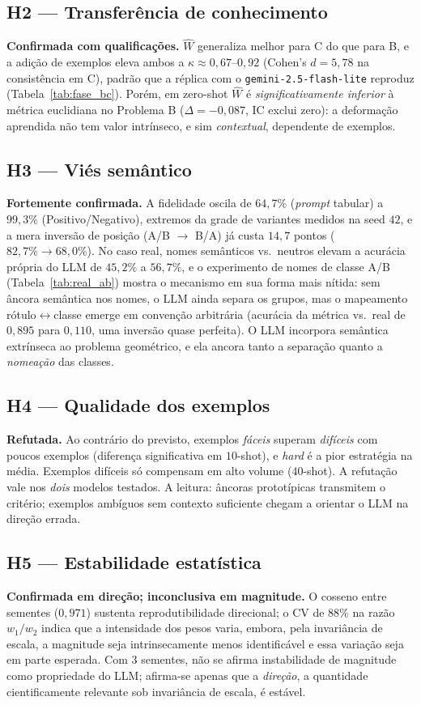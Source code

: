 \documentclass[12pt,a4paper]{article}
\newcommand{\West}{\ensuremath{\hat{W}}}   %
\begin{document}
\subsection{H2 — Transferência de conhecimento}
\textbf{Confirmada com qualificações.} \West{} generaliza melhor para C do que para B, e a
adição de exemplos eleva ambos a $\kappa \approx 0{,}67$–$0{,}92$ (Cohen's $d = 5{,}78$ na
consistência em C), padrão que a réplica com o \texttt{gemini-2.5-flash-lite} reproduz
(Tabela~\ref{tab:fase_bc}). Porém, em zero-shot \West{} é \emph{significativamente inferior} à
métrica euclidiana no Problema B ($\Delta = -0{,}087$, IC exclui zero): a deformação
aprendida não tem valor intrínseco, e sim \emph{contextual}, dependente de exemplos.

\subsection{H3 — Viés semântico}
\textbf{Fortemente confirmada.} A fidelidade oscila de $64{,}7\%$ (\emph{prompt} tabular) a
$99{,}3\%$ (Positivo/Negativo), extremos da grade de variantes medidos na seed $42$, e a
mera inversão de posição (A/B $\to$ B/A) já custa $14{,}7$ pontos ($82{,}7\% \to 68{,}0\%$).
No caso real, nomes semânticos vs.\ neutros elevam a acurácia própria do LLM de $45{,}2\%$ a
$56{,}7\%$, e o experimento de nomes de classe A/B (Tabela~\ref{tab:real_ab}) mostra o
mecanismo em sua forma mais nítida: sem âncora semântica nos nomes, o LLM ainda separa os
grupos, mas o mapeamento rótulo$\leftrightarrow$classe emerge em convenção arbitrária
(acurácia da métrica vs.\ real de $0{,}895$ para $0{,}110$, uma inversão quase perfeita).
O LLM incorpora semântica extrínseca ao problema geométrico, e ela ancora tanto a
separação quanto a \emph{nomeação} das classes.

\subsection{H4 — Qualidade dos exemplos}
\textbf{Refutada.} Ao contrário do previsto, exemplos \emph{fáceis} superam \emph{difíceis}
com poucos exemplos (diferença significativa em $10$-shot), e \emph{hard} é a pior
estratégia na média. Exemplos difíceis só compensam em alto volume ($40$-shot). A refutação
vale nos \emph{dois} modelos testados. A leitura: âncoras prototípicas transmitem o critério;
exemplos ambíguos sem contexto suficiente chegam a orientar o LLM na direção errada.

\subsection{H5 — Estabilidade estatística}
\textbf{Confirmada em direção; inconclusiva em magnitude.} O cosseno entre sementes
($0{,}971$) sustenta reprodutibilidade direcional; o CV de $88\%$ na razão $w_1/w_2$ indica
que a intensidade dos pesos varia, embora, pela invariância de escala, a magnitude seja
intrinsecamente menos identificável e essa variação seja em parte esperada. Com $3$ sementes,
não se afirma instabilidade de magnitude como propriedade do LLM; afirma-se apenas que a
\emph{direção}, a quantidade cientificamente relevante sob invariância de escala, é estável.
\end{document}
